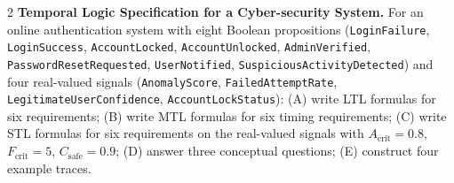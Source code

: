 \documentclass[a4paper, 11pt]{article}
\begin{document}
\begin{problem}{2}
\sloppy
\textbf{Temporal Logic Specification for a Cyber-security System.}
For an online authentication system with eight Boolean propositions (\texttt{LoginFailure}, \texttt{LoginSuccess}, \texttt{AccountLocked}, \texttt{AccountUnlocked}, \texttt{AdminVerified}, \texttt{PasswordResetRequested}, \texttt{UserNotified}, \texttt{SuspiciousActivityDetected}) and four real-valued signals (\texttt{AnomalyScore}, \texttt{FailedAttemptRate}, \texttt{LegitimateUserConfidence}, \texttt{AccountLockStatus}): (A) write LTL formulas for six requirements; (B) write MTL formulas for six timing requirements; (C) write STL formulas for six requirements on the real-valued signals with $A_{\text{crit}}=0.8$, $F_{\text{crit}}=5$, $C_{\text{safe}}=0.9$; (D) answer three conceptual questions; (E) construct four example traces.
\end{problem}
\end{document}
